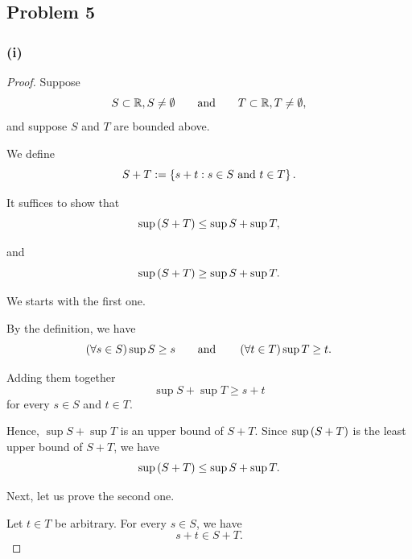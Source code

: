 \subsection{Problem 5}
\subsubsection{(i)}
\begin{proof}
Suppose
\begin{equation*}
S \subset \mathbb{R}, S \neq \emptyset \qquad \text{and} \qquad T \subset \mathbb{R}, T \neq \emptyset,
\end{equation*}
and suppose $S$ and $T$ are bounded above.

We define 
\begin{equation*}
    S + T := \left\{s + t : s \in S \text{ and } t \in T\right\}. 
\end{equation*}

It suffices to show that 
\begin{equation*}
    \sup \left(S + T\right) \leq \sup S + \sup T, 
\end{equation*}

and 
\begin{equation*}
    \sup \left(S + T\right) \geq \sup S + \sup T. 
\end{equation*}

We starts with the first one. 

By the definition, we have 
\begin{equation*}
    \left(\forall s \in S \right)\sup S \geq s \qquad \text{and} \qquad \left(\forall t \in T \right)\sup T \geq t. 
\end{equation*}

Adding them together 
\begin{equation*}
    \sup S + \sup T \geq s + t
\end{equation*}
for every $s \in S$ and $t \in T$.

Hence, $\sup S + \sup T$ is an upper bound of $S + T$. Since $\sup \left(S + T \right)$ is the least upper bound of $S + T$, we have 
\begin{equation*}
    \sup \left(S + T\right) \leq \sup S + \sup T. 
\end{equation*}

Next, let us prove the second one. 

Let $t \in T$ be arbitrary. For every $s \in S$, we have
\begin{equation*}
    s + t \in S + T.
\end{equation*}


\end{proof}
